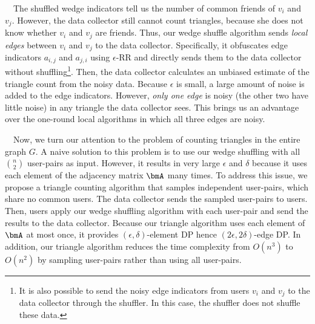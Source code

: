 \smallskip
{}~~The shuffled wedge indicators tell us the number of common friends of $v_i$ and $v_j$. 
However, the data collector still cannot count triangles, because she does not know whether $v_i$ and $v_j$ are friends. 
Thus, our wedge shuffle algorithm sends \textit{local edges} between $v_i$ and $v_j$ to the data collector. 
Specifically, it 
obfuscates edge indicators $a_{i,j}$ and $a_{j,i}$ using $\epsilon$-RR and directly sends 
them 
to the data collector without shuffling\footnote{It is also possible to send the noisy edge indicators from users $v_i$ and $v_j$ to the data collector through the shuffler. In this case, the shuffler does not shuffle these data.}. 
Then, the data collector calculates an unbiased estimate of the triangle count from the noisy data. 
Because $\epsilon$ is small, a large amount of noise is added to the edge indicators. 
However, \textit{only one edge} is noisy (the other two have little noise) in any triangle the data collector sees. 
This brings us an advantage over the one-round local algorithms in which all three edges are noisy. 

\smallskip
{}~~Now, we turn our attention to the problem of counting triangles in the entire graph $G$. 
A naive solution to this problem is to use our wedge shuffling with all $\binom{n}{2}$ user-pairs as input. 
However, it results in very large $\epsilon$ and $\delta$ because it uses each element of the adjacency matrix $\bmA$ many times. 
To address this issue, 
we propose a triangle counting algorithm that samples 
independent user-pairs, which share no common users. 
The data collector sends the sampled user-pairs to users. 
Then, users apply our wedge shuffling algorithm with each user-pair 
and send the results to the data collector. 
Because our triangle algorithm uses each element of 
$\bmA$ at most once, it provides $(\epsilon,\delta)$-element DP hence $(2\epsilon,2\delta)$-edge DP. 
In addition, our triangle algorithm reduces the time complexity from $O(n^3)$ to $O(n^2)$ by sampling user-pairs rather than using all user-pairs. 

